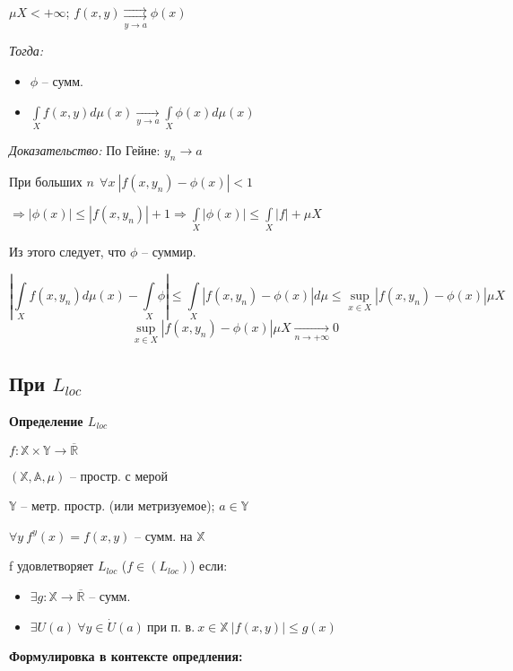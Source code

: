 \documentclass[paper=a4, fontsize=14pt]{report}
\begin{document}
\bigskip

$ \mu X < +\infty $; $ f(x,y) \underset{y \rightarrow a}{\rightrightarrows} \phi(x) $

\emph{Тогда:}

\begin{itemize}
	\item $ \phi $ -- сумм.
	\item $ \int\limits_{X} f(x, y) d\mu (x) \underset{y \rightarrow a}{\longrightarrow} \int\limits_{X} \phi(x) d\mu(x) $
\end{itemize}


\emph{Доказательство:} По Гейне: $ y_n \rightarrow a $

При больших $ n ~ ~ \forall x ~ |f(x, y_n) - \phi(x) | < 1$

$ \Rightarrow | \phi(x) | \leq | f(x, y_n) | + 1
  \Rightarrow \int\limits_X | \phi(x) | \leq \int\limits_X|f| + \mu X$

Из этого следует, что $ \phi $ -- суммир.

$$ |\int\limits_X f(x, y_n) d\mu(x) - \int\limits_X \phi |
\leq \int\limits_X | f(x, y_n) - \phi(x) | d\mu
\leq \sup\limits_{x \in X} | f(x, y_n) - \phi(x)| \mu X $$
$$\sup\limits_{x \in X} | f(x, y_n) - \phi(x)| \mu X \underset{n \rightarrow +\infty}{\longrightarrow} 0 $$

\subsection{При $L_{loc}$}

\textbf{Определение $ L_{loc} $}

$ f : \mathbb{X} \times \mathbb{Y} \rightarrow \overline{\mathbb{R}}$

$ (\mathbb{X}, \mathbb{A}, \mu) $ -- простр. с мерой

$ \mathbb{Y} $ -- метр. простр. (или метризуемое); $ a \in \mathbb{Y} $


$ \forall y ~ f^y(x) = f(x, y) $ -- сумм. на $ \mathbb{X} $

f удовлетворяет $ L_{loc} $ ($ f \in (L_{loc}) $) если:
\begin{itemize}
	\item  $ \exists g : \mathbb{X} \rightarrow \overline{\mathbb{R}} $ -- сумм.
	\item $ \exists U(a) ~ \forall y \in \dot{U} (a) ~ \text{при п. в.} ~ x \in \mathbb{X} ~ |f(x, y)| \leq g(x)$
\end{itemize}
\textbf{Формулировка в контексте опредления:}
\end{document}
